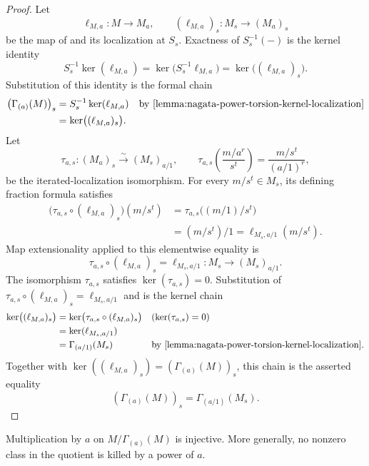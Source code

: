\begin{proof}
  \leanok
  Let
  \[
    \ell_{M,a}\colon M\to M_a,
    \qquad
    (\ell_{M,a})_s\colon M_s\to(M_a)_s
  \]
  be the map of  and its
  localization at $S_s$.  Exactness of $S_s^{-1}(-)$ is the kernel identity
  \[
    S_s^{-1}\ker(\ell_{M,a})
      =\ker\bigl(S_s^{-1}\ell_{M,a}\bigr)
      =\ker\bigl((\ell_{M,a})_s\bigr).
  \]
  Substitution of this identity is the formal chain
  \[
  \begin{aligned}
    \bigl(\Gamma_{(a)}(M)\bigr)_s
      &=S_s^{-1}\ker(\ell_{M,a})
        &&\text{by \Cref{lemma:nagata-power-torsion-kernel-localization}}\\
      &=\ker\bigl((\ell_{M,a})_s\bigr).
  \end{aligned}
  \]
  Let
  \[
    \tau_{a,s}\colon(M_a)_s\xrightarrow{\sim}(M_s)_{a/1},
    \qquad
    \tau_{a,s}\!\left(\frac{m/a^r}{s^t}\right)
       =\frac{m/s^t}{(a/1)^r},
  \]
  be the iterated-localization isomorphism.  For every $m/s^t\in M_s$, its
  defining fraction formula satisfies
  \[
  \begin{aligned}
    \bigl(\tau_{a,s}\circ(\ell_{M,a})_s\bigr)(m/s^t)
      &=\tau_{a,s}\bigl((m/1)/s^t\bigr)\\
      &=(m/s^t)/1
       =\ell_{M_s,a/1}(m/s^t).
  \end{aligned}
  \]
  Map extensionality applied to this elementwise equality is
  \[
    \tau_{a,s}\circ(\ell_{M,a})_s
      =\ell_{M_s,a/1}\colon M_s\longrightarrow(M_s)_{a/1}.
  \]
  The isomorphism $\tau_{a,s}$ satisfies
  $\ker(\tau_{a,s})=0$.  Substitution of
  $\tau_{a,s}\circ(\ell_{M,a})_s=\ell_{M_s,a/1}$ and
   is the kernel chain
  \[
  \begin{aligned}
    \ker\bigl((\ell_{M,a})_s\bigr)
      &=\ker\bigl(\tau_{a,s}\circ(\ell_{M,a})_s\bigr)
        &&(\ker(\tau_{a,s})=0)\\
      &=\ker(\ell_{M_s,a/1})\\
      &=\Gamma_{(a/1)}(M_s)
        &&\text{by \Cref{lemma:nagata-power-torsion-kernel-localization}}.
  \end{aligned}
  \]
  Together with
  $\ker((\ell_{M,a})_s)=(\Gamma_{(a)}(M))_s$, this chain is the asserted
  equality
  \[
    (\Gamma_{(a)}(M))_s=\Gamma_{(a/1)}(M_s).
  \]
\end{proof}

\begin{lemma}
  \label{lemma:nagata-power-torsion-quotient-torsionfree}
  \leanok

  Multiplication by $a$ on $M/\Gamma_{(a)}(M)$ is injective.  More generally,
  no nonzero class in the quotient is killed by a power of $a$.
\end{lemma}

